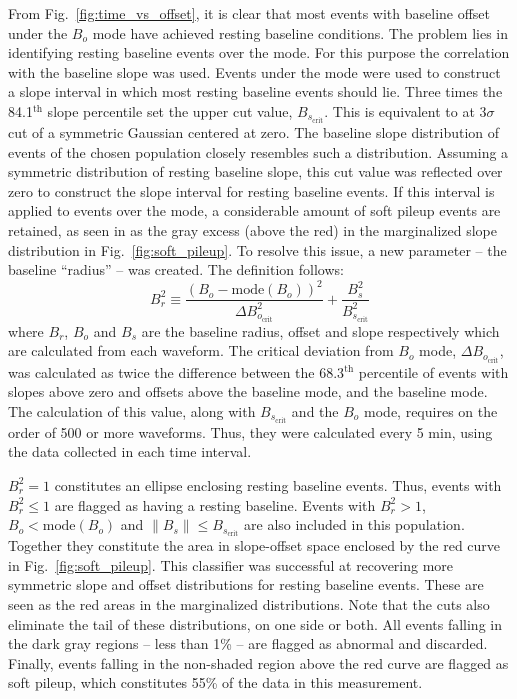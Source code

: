 From Fig.~\ref{fig:time_vs_offset}, it is clear that most events with baseline offset under the $B_o$ mode have achieved resting baseline conditions. The problem lies in identifying resting baseline events over the mode. For this purpose the correlation with the baseline slope was used. Events under the mode were used to construct a slope interval in which most resting baseline events should lie. Three times the 84.1$^\text{th}$ slope percentile set the upper cut value, $B_{s_\text{crit}}$. This is equivalent to at 3$\sigma$ cut of a symmetric Gaussian centered at zero. The baseline slope distribution of events of the chosen population closely resembles such a distribution. Assuming a symmetric distribution of resting baseline slope, this cut value was reflected over zero to construct the slope interval for resting baseline events. If this interval is applied to events over the mode, a considerable amount of soft pileup events are retained, as seen in as the gray excess (above the red) in the marginalized slope distribution in Fig.~\ref{fig:soft_pileup}. To resolve this issue, a new parameter -- the baseline ``radius'' -- was created. The definition follows: 
\begin{equation}
	B_r^2 \equiv \frac{(B_o - \text{mode}(B_o))^2}{\Delta B_{o_\text{crit}}^2} + \frac{B_s^2}{B_{s_\text{crit}}^2}
	\label{eq:baseline_radius}
\end{equation}
where $B_r$, $B_o$ and $B_s$ are the baseline radius, offset and slope respectively which are calculated from each waveform. The critical deviation from $B_o$ mode, $\Delta B_{o_\text{crit}}$, was calculated as twice the difference between the 68.3$^\text{th}$ percentile of events with slopes above zero and offsets above the baseline mode, and the baseline mode. The calculation of this value, along with $B_{s_\text{crit}}$ and the $B_o$ mode, requires on the order of 500 or more waveforms. Thus, they were calculated every 5 min, using the data collected in each time interval.

$B_r^2 = 1$ constitutes an ellipse enclosing resting baseline events. Thus, events with $B_r^2\le1$ are flagged as having a resting baseline. Events with $B_r^2>1$, $B_o < \text{mode}(B_o)$ and $\|B_s\| \le B_{s_\text{crit}}$ are also included in this population. Together they constitute the area in slope-offset space enclosed by the red curve in Fig.~\ref{fig:soft_pileup}. This classifier was successful at recovering more symmetric slope and offset distributions for resting baseline events. These are seen as the red areas in the marginalized distributions. Note that the cuts also eliminate the tail of these distributions, on one side or both. All events falling in the dark gray regions -- less than 1\% -- are flagged as abnormal and discarded. Finally, events falling in the non-shaded region above the red curve are flagged as soft pileup, which constitutes 55\% of the data in this measurement. 

